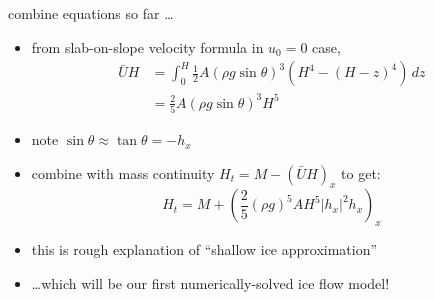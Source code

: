 \begin{frame}{combine equations so far \dots}

\begin{itemize}
\item from slab-on-slope velocity formula in $u_0=0$ case,
\begin{align*}
\bar U H &= \int_0^H \frac{1}{2} A (\rho g \sin\theta)^3  \left(H^4 - (H-z)^4\right)\,dz \\
	&= \frac{2}{5} A (\rho g \sin\theta)^3 H^5
\end{align*}
\item note $\sin \theta \approx \tan\theta = - h_x$
\item combine with mass continuity $H_t = M - \left(\bar U H\right)_x$ to get:
  $$H_t = M + \left(\frac{2}{5} (\rho g)^5 A H^5 |h_x|^2 h_x\right)_x$$

\medskip
\item this is rough explanation of ``shallow ice approximation''
\item \dots which will be our first numerically-solved ice flow model!
\end{itemize}
\end{frame}